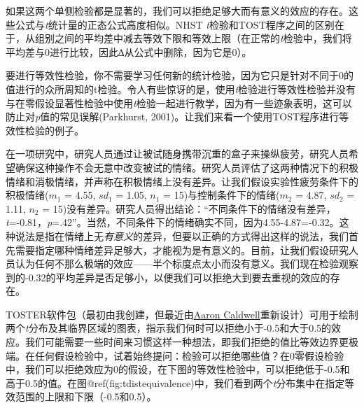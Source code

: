 \documentclass[
  letterpaper,
  DIV=11,
  numbers=noendperiod]{scrreprt}
\begin{document}
如果这两个单侧检验都是显著的，我们可以拒绝足够大而有意义的效应的存在。这些公式与\emph{t}统计量的正态公式高度相似。NHST
\emph{t}检验和TOST程序之间的区别在于，从组别之间的平均差中减去等效下限和等效上限（在正常的\emph{t}检验中，我们将平均差与0进行比较，因此∆从公式中删除，因为它是0）。

要进行等效性检验，你不需要学习任何新的统计检验，因为它只是针对不同于0的值进行的众所周知的t检验。令人有些惊讶的是，使用\emph{t}检验进行等效性检验并没有与在零假设显著性检验中使用\emph{t}检验一起进行教学，因为有一些迹象表明，这可以防止对\emph{p}值的常见误解(Parkhurst,
2001)。让我们来看一个使用TOST程序进行等效性检验的例子。

在一项研究中，研究人员通过让被试随身携带沉重的盒子来操纵疲劳，研究人员希望确保这种操作不会无意中改变被试的情绪。研究人员评估了这两种情况下的积极情绪和消极情绪，并声称在积极情绪上没有差异。让我们假设实验性疲劳条件下的积极情绪(\(m_1\)
= 4.55, \(sd_1\) = 1.05, \(n_1\) = 15)与控制条件下的情绪(\(m_2\) = 4.87,
\(sd_2\) = 1.11, \(n_2\) =
15)没有差异。研究人员得出结论：``不同条件下的情绪没有差异，\emph{t}=-0.81，\emph{p}=.42''。当然，不同条件下的情绪确实不同，因为4.55-4.87=-0.32。这种说法是指在情绪上无\emph{有意义}的差异，但要以正确的方式得出这样的说法，我们首先需要指定哪种情绪差异足够大，才能视为是有意义的。目前，让我们假设研究人员认为任何不那么极端的效应------半个标度点太小而没有意义。我们现在检验观察到的-0.32的平均差异是否足够小，以便我们可以拒绝大到要去重视的效应的存在。

TOSTER软件包（最初由我创建，但最近由\href{https://aaroncaldwell.us/}{Aaron
Caldwell}重新设计）可用于绘制两个\emph{t}分布及其临界区域的图表，指示我们何时可以拒绝小于-0.5和大于0.5的效应。我们可能需要一些时间来习惯这样一种想法，即我们拒绝的值比等效边界更极端。在任何假设检验中，试着始终提问：检验可以拒绝哪些值？在0零假设检验中，我们可以拒绝效应为0的假设，在下图的等效性检验中，可以拒绝低于-0.5和高于0.5的值。在图@ref(fig:tdistequivalence)中，我们看到两个\emph{t}分布集中在指定等效范围的上限和下限（-0.5和0.5）。
\end{document}
